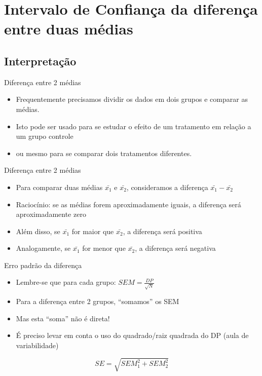\documentclass{beamer}
\begin{document}
\section[IC diferença 2 médias]{Intervalo de Confiança da diferença entre duas médias}

\subsection{Interpretação}

\begin{frame}{Diferença entre 2 médias}
  \begin{itemize}
  \item Frequentemente precisamos dividir os dados em dois grupos e
    comparar as médias.
  \item Isto pode ser usado para se estudar o efeito de um tratamento
    em relação a um grupo controle
  \item ou mesmo para se comparar dois tratamentos diferentes.
  \end{itemize}
\end{frame}

\begin{frame}{Diferença entre 2 médias}
  \begin{itemize}
  \item Para comparar duas médias $\bar{x_1}$ e $\bar{x_2}$, consideramos a diferença $\bar{x_1} - \bar{x_2}$
  \item Raciocínio: se as médias forem aproximadamente iguais, a
    diferença será aproximadamente zero
  \item Além disso, se $\bar{x_1}$ for maior que $\bar{x_2}$, a diferença será positiva
  \item Analogamente, se $\bar{x_1}$ for menor que $\bar{x_2}$, a diferença será negativa
  \end{itemize}
\end{frame}

\begin{frame}{Erro padrão da diferença}
  \begin{itemize}
  \item Lembre-se que para cada grupo: $SEM = \frac{DP}{\sqrt{N}}$
  \item Para a diferença entre 2 grupos, ``somamos'' os SEM
  \item Mas esta ``soma'' não é direta!
  \item É preciso levar em conta o uso do quadrado/raiz quadrada do DP (aula de variabilidade)
  \end{itemize}
  \begin{block}{}
      \begin{displaymath}
    SE = \sqrt{SEM_1^2 + SEM_2^2}
  \end{displaymath}
  \end{block}
\end{frame}
\end{document}
